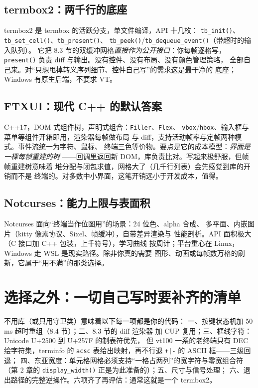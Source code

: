 \documentclass[12pt,a4paper,fontset=fandol]{ctexbook}
\newcommand{\cpp}[1]{C++#1}
\newcommand{\Fn}[1]{\texttt{#1()}}
\newcommand{\Tp}[1]{\texttt{#1}}
\newcommand{\Bk}{\allowbreak}
\begin{document}
\subsection{termbox2：两千行的底座}

termbox2 是 termbox 的活跃分支，单文件编译，API 十几枚：
\Fn{tb\Bk\_init}、\Fn{tb\Bk\_set\Bk\_cell}、\Fn{tb\Bk\_present}、
\Fn{tb\Bk\_peek}/{\Bk}\Fn{tb\Bk\_dequeue\Bk\_event}（带超时的输入队列）。
它把 8.3 节的双缓冲网格\emph{直接作为公开接口}：你每帧逐格写，
\Fn{present} 负责 diff 与输出。没有控件、没有布局、没有颜色管理策略，
全部自己来。对``只想甩掉转义序列细节、控件自己写''的需求这是最干净的
底座；Windows 有原生后端，不要求 VT。

\subsection{FTXUI：现代 C++ 的默认答案}

\cpp{17}，DOM 式组件树，声明式组合：\Tp{Filler}、\Tp{Flex}、
\Tp{vbox}/{\Bk}\Tp{hbox}、输入框与菜单等组件开箱即用，渲染器每帧做布局
与 diff，支持活动帧率与定帧两种模式。事件流统一为字符、鼠标、
终端三色等价物。要点是它的成本模型：\emph{界面是一棵每帧重建的树}
——回调里返回新 DOM，库负责比对。写起来极舒服，但帧帧重建树意味着
堆分配与闭包求值，网格大了（几千行列表）会先感觉到库的开销而不是
终端的。对多数中小界面，这笔开销远小于开发成本，值得。

\subsection{Notcurses：能力上限与表面积}

Notcurses 面向``终端当作位图用''的场景：24 位色、alpha 合成、
多平面、内嵌图片（kitty 像素协议、Sixel、帧缓冲），自带差异渲染与
性能剖析。API 面积极大（C 接口加 C++ 包装，上千符号），学习曲线
按周计；平台重心在 Linux，Windows 走 WSL 是现实路径。除非你真的需要
图形、动画或每帧数万格的刷新，它属于``用不满''的那类选择。

\section{选择之外：一切自己写时要补齐的清单}

\begin{guideline}[title={裸 VT 路线的六项自备件}]
不用库（或只用守卫类）意味着以下每一项都是你的代码：
一、按键状态机加 50 ms 超时重组（8.4 节）；二、8.3 节的 diff 渲染器
加 CUP 复用；三、框线字符：Unicode U+2500 到 U+257F 的制表符优先，
但 vt100 一系的老终端只有 DEC 绘字符集，terminfo 的
\Tp{acsc} 表给出映射，再不行退 \Tp{+|-} 的 ASCII 框——三级回退；
四、东亚宽度：单元格网格必须支持``一格占两列''的宽字符与零宽组合符
（第 2 章的 \Fn{display\_width} 正是为此准备的）；五、尺寸与信号处理；
六、退出路径的完整逆操作。六项齐了再评估：通常这就是一个 termbox2。
\end{guideline}
\end{document}
